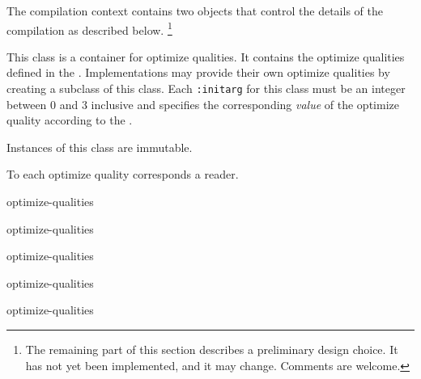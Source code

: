 The compilation context contains two objects that control the details
of the compilation as described below.%
\footnote{The remaining part of this section describes a preliminary
  design choice.  It has not yet been implemented, and it may change.
  Comments are welcome.}


This class is a container for optimize qualities.  It contains the
optimize qualities defined in the \hs{}.  Implementations may provide
their own optimize qualities by creating a subclass of this class.
Each \texttt{:initarg} for this class must be an integer between $0$ and
$3$ inclusive and specifies the corresponding \emph{value} of the
optimize quality according to the \hs{}.

Instances of this class are immutable.






To each optimize quality corresponds a reader.

 {optimize-qualities}

 {optimize-qualities}

 {optimize-qualities}

 {optimize-qualities}

 {optimize-qualities}
